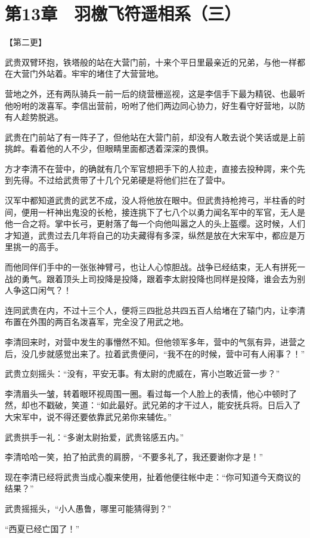 \section{第13章　羽檄飞符遥相系（三）}

【第二更】

武贵双臂环抱，铁塔般的站在大营门前，十来个平日里最亲近的兄弟，与他一样都在大营门外站着。牢牢的堵住了大营营地。

营地之外，还有两队骑兵一前一后的绕营栅巡视，这是李信手下最为精锐、也最听他吩咐的泼喜军。李信出营前，吩咐了他们两边同心协力，好生看守好营地，以防有人趁势脱逃。

武贵在门前站了有一阵子了，但他站在大营门前，却没有人敢去说个笑话或是上前挑衅。看着他的人不少，但眼睛里面都透着深深的畏惧。

方才李清不在营中，的确就有几个军官想把手下的人拉走，直接去投种諤，来个先到先得。不过给武贵带了十几个兄弟硬是将他们拦在了营中。

汉军中都知道武贵的武艺不成，没人将他放在眼中。但武贵持枪挎弓，半柱香的时间，便用一杆神出鬼没的长枪，接连挑下了七八个以勇力闻名军中的军官，无人是他一合之将。掌中长弓，更射落了每一个向他叫嚣之人的头上盔缨。这时候，人们才知道，武贵过去几年将自己的功夫藏得有多深，纵然是放在大宋军中，都应是万里挑一的高手。

而他同伴们手中的一张张神臂弓，也让人心惊胆战。战争已经结束，无人有拼死一战的勇气。跟着顶头上司投降是投降，跟着李太尉投降也同样是投降，谁会去为别人争这口闲气？！

连同武贵在内，不过十三个人，便将三四批总共四五百人给堵在了辕门内，让李清布置在外围的两百名泼喜军，完全没了用武之地。

李清回来时，对营中发生的事懵然不知。但他领军多年，营中的气氛有异，进营之后，没几步就感觉出来了。拉着武贵便问，“我不在的时候，营中可有人闹事？！”

武贵立刻摇头：“没有，平安无事。有太尉的虎威在，宵小岂敢近营一步？”

李清眉头一皱，转着眼环视周围一圈。看过每一个人脸上的表情，他心中顿时了然，却也不戳破，笑道：“如此最好。武兄弟的才干过人，能安抚兵将。日后入了大宋军中，说不得还要依靠武兄弟你来辅佐。”

武贵拱手一礼：“多谢太尉抬爱，武贵铭感五内。”

李清哈哈一笑，拍了拍武贵的肩膀，“不要多礼了，我还要谢你才是！”

现在李清已经将武贵当成心腹来使用，扯着他便往帐中走：“你可知道今天商议的结果？”

武贵摇摇头，“小人愚鲁，哪里可能猜得到？”

“西夏已经亡国了！”

